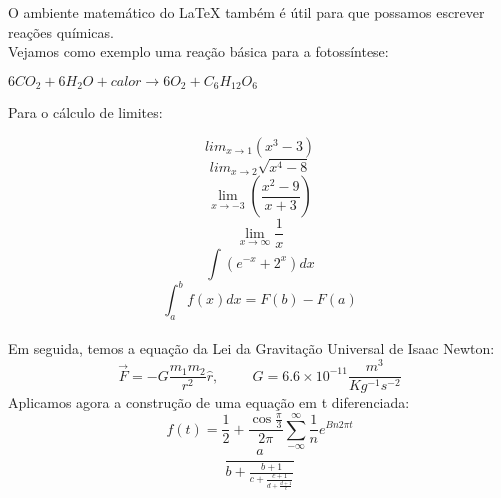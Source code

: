 \documentclass[a4paper, 12pt]{article}
\begin{document}
O ambiente matemático do LaTeX também é útil para que possamos escrever reações químicas.\\

Vejamos como exemplo uma reação básica para a fotossíntese:\\
\begin{center}
$6 CO_{2} + 6 H_{2}O + calor \rightarrow 6 O_{2} + C_{6}H_{12}O_{6}$
\end{center}

Para o cálculo de limites:

\begin{equation}
lim_{x \rightarrow 1}(x^{3} - 3)
\end{equation}
\vspace{0.5cm}
\begin{equation}
lim_{x \rightarrow 2}\sqrt{x^{4}-8}
\end{equation}
\vspace{0.5cm}
\begin{equation}
\lim_{x \rightarrow -3}\left(\frac{x^{2}-9}{x+3}\right)
\end{equation}
\vspace{0.5cm}
\begin{equation}
\lim_{x \rightarrow \infty}\frac{1}{x}
\end{equation}
\vspace{0.5cm}
\begin{equation}
\int(e^{-x} + 2^{x})dx 
\end{equation}
\vspace{0.5cm}
\begin{equation}
\int_{a}^{b}f(x)dx = F(b) - F(a)
\end{equation}\\
\vspace{0.5cm}
Em seguida, temos a equação da Lei da Gravitação Universal de Isaac Newton:
\begin{equation}
\vec{F} = -G\frac{m_{1}m_{2}}{r^{2}}\hat{r},\hspace{1cm} G = 6.6 \times 10^{-11}\frac{m^{3}}{Kg^{-1}s^{-2}}
\end{equation}
\vspace{0.5cm}
Aplicamos agora a construção de uma equação em t diferenciada:
\begin{equation}
f(t) = \frac{1}{2} + \frac{\cos\frac{\pi}{3}}{2\pi}\sum_{-\infty}^{\infty}\frac{1}{n}e^{Bn2\pi t}
\end{equation}
\vspace{0.5cm}
\begin{equation}
\frac{a}{b+\frac{b+1}{c+\frac{c+1}{d+\frac{d+1}{e}}}}
\end{equation}
\end{document}
